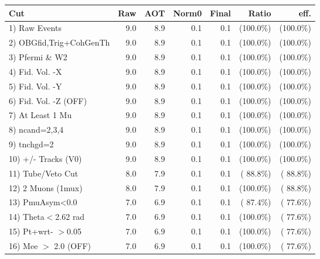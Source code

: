  \begin{table}[h!]\centering
 \begin{tabular}{||l||r|r|r|r|r|r||}
 \hline
 \hline
 Cut & Raw & AOT & Norm0 & Final & Ratio & eff.       \\
 \hline
  1) Raw Events           &          9.0 &          8.9 &          0.1 &          0.1 & (100.0\%) & (100.0\%) \\
  2) OBGfid,Trig+CohGenTh &          9.0 &          8.9 &          0.1 &          0.1 & (100.0\%) & (100.0\%) \\
  3) Pfermi \& W2         &          9.0 &          8.9 &          0.1 &          0.1 & (100.0\%) & (100.0\%) \\
  4) Fid. Vol. -X         &          9.0 &          8.9 &          0.1 &          0.1 & (100.0\%) & (100.0\%) \\
  5) Fid. Vol. -Y         &          9.0 &          8.9 &          0.1 &          0.1 & (100.0\%) & (100.0\%) \\
  6) Fid. Vol. -Z (OFF)   &          9.0 &          8.9 &          0.1 &          0.1 & (100.0\%) & (100.0\%) \\
  7) At Least 1 Mu        &          9.0 &          8.9 &          0.1 &          0.1 & (100.0\%) & (100.0\%) \\
  8) ncand=2,3,4          &          9.0 &          8.9 &          0.1 &          0.1 & (100.0\%) & (100.0\%) \\
  9) tnchgd=2             &          9.0 &          8.9 &          0.1 &          0.1 & (100.0\%) & (100.0\%) \\
 10) +/- Tracks (V0)      &          9.0 &          8.9 &          0.1 &          0.1 & (100.0\%) & (100.0\%) \\
 11) Tube/Veto Cut        &          8.0 &          7.9 &          0.1 &          0.1 & ( 88.8\%) & ( 88.8\%) \\
 12) 2 Muons (1mux)       &          8.0 &          7.9 &          0.1 &          0.1 & (100.0\%) & ( 88.8\%) \\
 13) PmuAsym<0.0          &          7.0 &          6.9 &          0.1 &          0.1 & ( 87.4\%) & ( 77.6\%) \\
 14) Theta$<$2.62 rad     &          7.0 &          6.9 &          0.1 &          0.1 & (100.0\%) & ( 77.6\%) \\
 15) Pt+wrt- $>$0.05      &          7.0 &          6.9 &          0.1 &          0.1 & (100.0\%) & ( 77.6\%) \\
 16) Mee $>$ 2.0  (OFF)   &          7.0 &          6.9 &          0.1 &          0.1 & (100.0\%) & ( 77.6\%) \\

\end{tabular}
\end{table}
